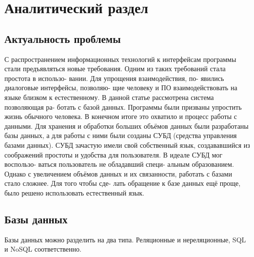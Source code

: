 \chapter{Аналитический раздел}
\label{cha:analysis}
%
%
\section{Актуальность проблемы}
С распространением информационных
технологий к интерфейсам программы стали
предъявляться новые требования. Одним из
таких требований стала простота в использо-
вании. Для упрощения взаимодействия, по-
явились диалоговые интерфейсы, позволяю-
щие человеку и ПО взаимодействовать на
языке близком к естественному. В данной
статье рассмотрена система позволяющая ра-
ботать с базой данных.
Программы были призваны упростить
жизнь обычного человека. В конечном итоге
это охватило и процесс работы с данными.
Для хранения и обработки больших объёмов
данных были разработаны базы данных, а для
работы с ними были созданы СУБД (средства
управления базами данных). СУБД зачастую
имели свой собственный язык, создававшийся
из соображений простоты и удобства для
пользователя. В идеале СУБД мог воспользо-
ваться пользователь не обладавший специ-
альным образованием. Однако с увеличением
объёмов данных и их связанности, работать с
базами стало сложнее. Для того чтобы сде-
лать обращение к базе данных ещё проще,
было решено использовать естественный
язык.



\section{Базы данных}

Базы данных можно разделить на два типа. Реляционные и нереляционные, SQL и NoSQL соответственно.
